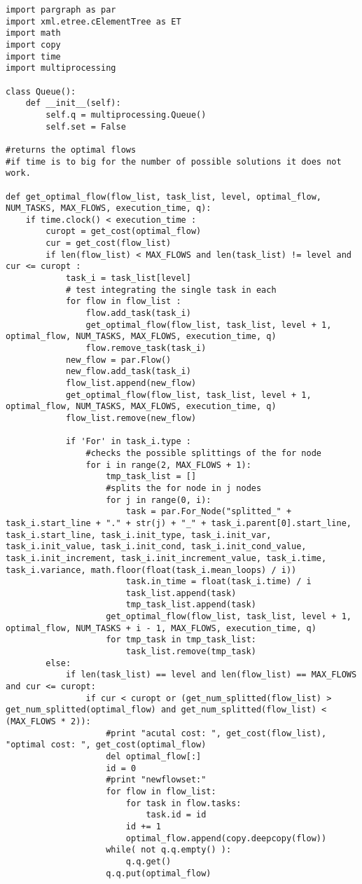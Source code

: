 \documentclass[a4paper,10pt,twoside]{book}
\begin{document}
\begin{lstlisting}[language=CCC, caption=graphCreator.py]
import pargraph as par
import xml.etree.cElementTree as ET
import math
import copy
import time
import multiprocessing

class Queue():
	def __init__(self):
		self.q = multiprocessing.Queue()
		self.set = False

#returns the optimal flows 
#if time is to big for the number of possible solutions it does not work.

def get_optimal_flow(flow_list, task_list, level, optimal_flow, NUM_TASKS, MAX_FLOWS, execution_time, q):
	if time.clock() < execution_time :
		curopt = get_cost(optimal_flow)
		cur = get_cost(flow_list)
		if len(flow_list) < MAX_FLOWS and len(task_list) != level and cur <= curopt :
			task_i = task_list[level]
			# test integrating the single task in each
			for flow in flow_list :
				flow.add_task(task_i)
				get_optimal_flow(flow_list, task_list, level + 1, optimal_flow, NUM_TASKS, MAX_FLOWS, execution_time, q)
				flow.remove_task(task_i)
			new_flow = par.Flow()		
			new_flow.add_task(task_i)
			flow_list.append(new_flow)
			get_optimal_flow(flow_list, task_list, level + 1, optimal_flow, NUM_TASKS, MAX_FLOWS, execution_time, q)
			flow_list.remove(new_flow)

			if 'For' in task_i.type :
				#checks the possible splittings of the for node
				for i in range(2, MAX_FLOWS + 1):
					tmp_task_list = []
					#splits the for node in j nodes
					for j in range(0, i):
						task = par.For_Node("splitted_" + task_i.start_line + "." + str(j) + "_" + task_i.parent[0].start_line, task_i.start_line, task_i.init_type, task_i.init_var, task_i.init_value, task_i.init_cond, task_i.init_cond_value, task_i.init_increment, task_i.init_increment_value, task_i.time, task_i.variance, math.floor(float(task_i.mean_loops) / i))
						task.in_time = float(task_i.time) / i
						task_list.append(task)
						tmp_task_list.append(task)
					get_optimal_flow(flow_list, task_list, level + 1, optimal_flow, NUM_TASKS + i - 1, MAX_FLOWS, execution_time, q)
					for tmp_task in tmp_task_list:
						task_list.remove(tmp_task)		
		else:
			if len(task_list) == level and len(flow_list) == MAX_FLOWS and cur <= curopt:
				if cur < curopt or (get_num_splitted(flow_list) > get_num_splitted(optimal_flow) and get_num_splitted(flow_list) < (MAX_FLOWS * 2)):
					#print "acutal cost: ", get_cost(flow_list), "optimal cost: ", get_cost(optimal_flow)
					del optimal_flow[:]
					id = 0
					#print "newflowset:"
					for flow in flow_list:
						for task in flow.tasks:
							task.id = id
						id += 1
						optimal_flow.append(copy.deepcopy(flow))
					while( not q.q.empty() ):
						q.q.get()
					q.q.put(optimal_flow)


\end{lstlisting}
\end{document}
